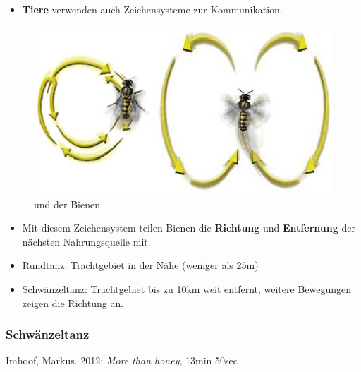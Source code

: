 \begin{frame}

\begin{itemize}
	\item<1-> \textbf{Tiere} verwenden auch Zeichensysteme zur Kommunikation.
\end{itemize}			
			
\begin{figure}[H]
\centering

\includegraphics[scale=0.15]{material/01SSBienentanz}
\caption{ und  der Bienen}
\label{Zeichen2}
\end{figure}




\begin{itemize}
	\item<2-> Mit diesem Zeichensystem teilen Bienen die \textbf{Richtung} und \textbf{Entfernung} der nächsten Nahrungsquelle mit. 
	\item<2-> Rundtanz: Trachtgebiet in der Nähe (weniger als 25m)
	\item<2-> Schwänzeltanz: Trachtgebiet bis zu 10km weit entfernt, weitere Bewegungen zeigen die Richtung an.
\end{itemize}		
		
\end{frame}			

\begin{frame}
\frametitle{Schwänzeltanz}

Imhoof, Markus. 2012: \emph{More than honey}, 13min 50sec



\end{frame}


